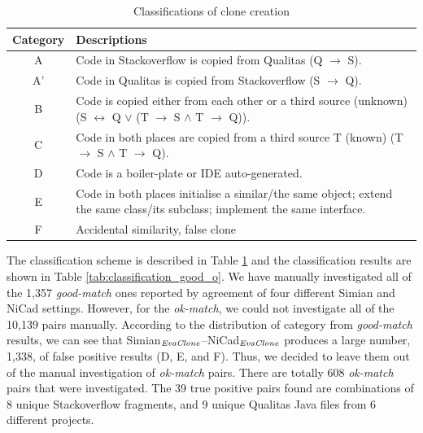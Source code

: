\documentclass{sig-alternate-05-2015}
\begin{document}

\begin{table}
	\centering
	\caption{Classifications of clone creation}
	\label{tab:classification_scheme}
	\begin{tabular}{|c|p{13cm}|}
		\hline 
		Category & Descriptions \\ 
		\hline 
		A & Code in Stackoverflow is copied from Qualitas (Q $\rightarrow$ S). \\ 
		\hline 
		A' & Code in Qualitas is copied from Stackoverflow (S $\rightarrow$ Q). \\ 
		\hline 
		B & Code is copied either from each other or a third source (unknown) (S $\leftrightarrow$ Q $\vee$ (T $\rightarrow$ S $\wedge$ T $\rightarrow$ Q)).
		\\ 
		\hline 
		C & Code in both places are copied from a third source T (known) (T $\rightarrow$ S $\wedge$ T $\rightarrow$ Q).
		\\ 
		\hline 
		D & Code is a boiler-plate or IDE auto-generated.
		\\ 
		\hline 
		E & Code in both places initialise a similar/the same object; extend the same class/its subclass; implement the same interface.
		\\ 
		\hline 
		F & Accidental similarity, false clone \\ 
		\hline 
	\end{tabular} 
\end{table}

The classification scheme is described in Table \ref{tab:classification_scheme} and the classification results are shown in Table \ref{tab:classification_good_o}. We have manually investigated all of the 1,357 \textit{good-match} ones reported by agreement of four different Simian and NiCad settings.  However, for the \textit{ok-match}, we could not investigate all of the 10,139 pairs manually.  According to the distribution of category from \textit{good-match} results, we can see that Simian$_{\textrm{\textit{EvaClone}}}$--NiCad$_{\textrm{\textit{EvaClone}}}$ produces a large number, 1,338, of false positive results (D, E, and F). Thus, we decided to leave them out of the manual investigation of \textit{ok-match} pairs. There are totally 608 \textit{ok-match} pairs that were investigated. The 39 true positive pairs found are combinations of 8 unique Stackoverflow fragments, and 9 unique Qualitas Java files from 6 different projects.
\end{document}
